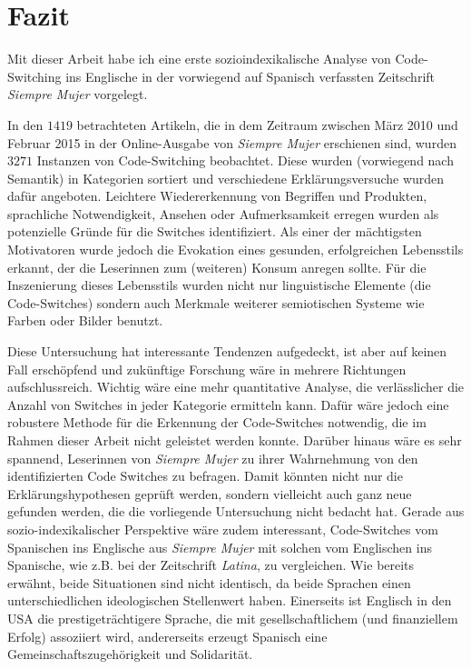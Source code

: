 \section{Fazit}
\label{chap:conclusion}

Mit dieser Arbeit habe ich eine erste sozioindexikalische Analyse von Code-Switching ins Englische in der vorwiegend auf Spanisch verfassten Zeitschrift \textit{Siempre Mujer} vorgelegt.

In den $1419$ betrachteten Artikeln, die in dem Zeitraum zwischen März 2010 und Februar 2015 in der Online-Ausgabe von \textit{Siempre Mujer} erschienen sind, wurden $3271$ Instanzen von Code-Switching beobachtet.
Diese wurden (vorwiegend nach Semantik) in Kategorien sortiert und verschiedene Erklärungsversuche wurden dafür angeboten.
Leichtere Wiedererkennung von Begriffen und Produkten, sprachliche Notwendigkeit, Ansehen oder Aufmerksamkeit erregen wurden als potenzielle Gründe für die Switches identifiziert.
Als einer der mächtigsten Motivatoren wurde jedoch die Evokation eines gesunden, erfolgreichen Lebensstils erkannt, der die Leserinnen zum (weiteren) Konsum anregen sollte.
Für die Inszenierung dieses Lebensstils wurden nicht nur linguistische Elemente (die Code-Switches) sondern auch Merkmale weiterer semiotischen Systeme wie Farben oder Bilder benutzt.

Diese Untersuchung hat interessante Tendenzen aufgedeckt, ist aber auf keinen Fall erschöpfend und zukünftige Forschung wäre in mehrere Richtungen aufschlussreich.
Wichtig wäre eine mehr quantitative Analyse, die verlässlicher die Anzahl von Switches in jeder Kategorie ermitteln kann.
Dafür wäre jedoch eine robustere Methode für die Erkennung der Code-Switches notwendig, die im Rahmen dieser Arbeit nicht geleistet werden konnte.
Darüber hinaus wäre es sehr spannend, Leserinnen von \textit{Siempre Mujer} zu ihrer Wahrnehmung von den identifizierten Code Switches zu befragen.
Damit könnten nicht nur die Erklärungshypothesen geprüft werden, sondern vielleicht auch ganz neue gefunden werden, die die vorliegende Untersuchung nicht bedacht hat.
Gerade aus sozio-indexikalischer Perspektive wäre zudem interessant, Code-Switches vom Spanischen ins Englische aus \textit{Siempre Mujer} mit solchen vom Englischen ins Spanische, wie z.B. bei der Zeitschrift \textit{Latina}, zu vergleichen.
Wie bereits erwähnt, beide Situationen sind nicht identisch, da beide Sprachen einen unterschiedlichen ideologischen Stellenwert haben.
Einerseits ist Englisch in den USA die prestigeträchtigere Sprache, die mit gesellschaftlichem (und finanziellem Erfolg) assoziiert wird,
andererseits erzeugt Spanisch eine Gemeinschaftszugehörigkeit und Solidarität.

